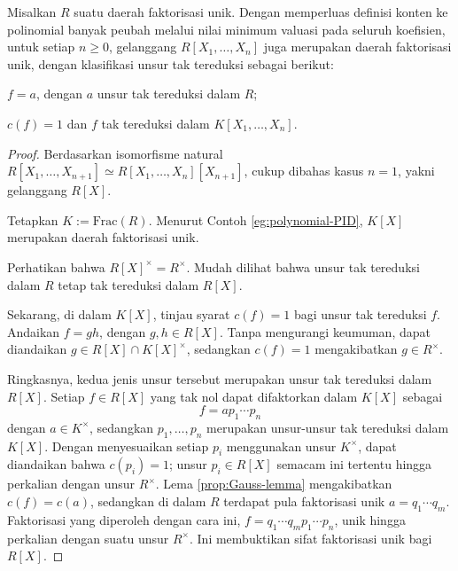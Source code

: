 \begin{theorem}\label{prop:polynomial-UFD}
	Misalkan $R$ suatu daerah faktorisasi unik. Dengan memperluas definisi konten ke polinomial banyak peubah melalui nilai minimum valuasi pada seluruh koefisien, untuk setiap $n \geq 0$, gelanggang $R[X_1, \ldots, X_n]$ juga merupakan daerah faktorisasi unik, dengan klasifikasi unsur tak tereduksi sebagai berikut:
	\begin{compactenum}[(a)]
		\item $f = a$, dengan $a$ unsur tak tereduksi dalam $R$;
		\item $c(f)=1$ dan $f$ tak tereduksi dalam $K[X_1, \ldots, X_n]$.
	\end{compactenum}
\end{theorem}
\begin{proof}
	Berdasarkan isomorfisme natural $R[X_1, \ldots, X_{n+1}] \simeq R[X_1, \ldots, X_n][X_{n+1}]$, cukup dibahas kasus $n=1$, yakni gelanggang $R[X]$.

	Tetapkan $K := \text{Frac}(R)$. Menurut Contoh \ref{eg:polynomial-PID}, $K[X]$ merupakan daerah faktorisasi unik.
	\begin{inparaenum}[(a)]
		\item Perhatikan bahwa $R[X]^\times = R^\times$. Mudah dilihat bahwa unsur tak tereduksi dalam $R$ tetap tak tereduksi dalam $R[X]$.
		\item Sekarang, di dalam $K[X]$, tinjau syarat $c(f)=1$ bagi unsur tak tereduksi $f$. Andaikan $f = gh$, dengan $g, h \in R[X]$. Tanpa mengurangi keumuman, dapat diandaikan $g \in R[X] \cap K[X]^\times$, sedangkan $c(f)=1$ mengakibatkan $g \in R^\times$.
	\end{inparaenum}
	Ringkasnya, kedua jenis unsur tersebut merupakan unsur tak tereduksi dalam $R[X]$. Setiap $f \in R[X]$ yang tak nol dapat difaktorkan dalam $K[X]$ sebagai
	\[ f = a p_1 \cdots p_n \]
	dengan $a \in K^\times$, sedangkan $p_1, \ldots, p_n$ merupakan unsur-unsur tak tereduksi dalam $K[X]$. Dengan menyesuaikan setiap $p_i$ menggunakan unsur $K^\times$, dapat diandaikan bahwa $c(p_i)=1$; unsur $p_i \in R[X]$ semacam ini tertentu hingga perkalian dengan unsur $R^\times$. Lema \ref{prop:Gauss-lemma} mengakibatkan $c(f)=c(a)$, sedangkan di dalam $R$ terdapat pula faktorisasi unik $a = q_1 \cdots q_m$. Faktorisasi yang diperoleh dengan cara ini, $f = q_1 \cdots q_m p_1 \cdots p_n$, unik hingga perkalian dengan suatu unsur $R^\times$. Ini membuktikan sifat faktorisasi unik bagi $R[X]$.
\end{proof}

